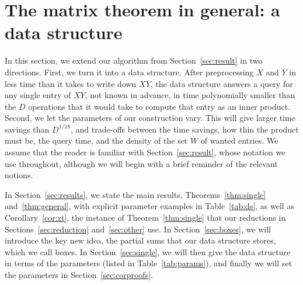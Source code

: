 \section{The matrix theorem in general: a data structure}\label{sec:general}

In this section, we extend our algorithm from Section~\ref{sec:result} in two directions. First, we turn it into a data structure. After preprocessing $X$ and $Y$ in less time than it takes to write down $XY$, the data structure answers a query for any single entry of $XY$, not known in advance, in time polynomially smaller than the $D$ operations that it would take to compute that entry as an inner product. Second, we let the parameters of our construction vary. This will give larger time savings than $D^{1/18}$, and trade-offs between the time savings, how thin the product must be, the query time, and the density of the set $W$ of wanted entries. We assume that the reader is familiar with Section~\ref{sec:result}, whose notation we use throughout, although we will begin with a brief reminder of the relevant notions.

In Section~\ref{sec:results}, we state the main results, Theorems~\ref{thm:single} and~\ref{thm:general}, with explicit parameter examples in Table~\ref{tab:ds}, as well as Corollary~\ref{cor:zt}, the instance of Theorem~\ref{thm:single} that our reductions in Sections~\ref{sec:reduction} and~\ref{sec:other} use. In Section~\ref{sec:boxes}, we will introduce the key new idea, the partial sums that our data structure stores, which we call boxes. In Section~\ref{sec:single}, we will then give the data structure in terms of the parameters (listed in Table~\ref{tab:params}), and finally we will set the parameters in Section~\ref{sec:corproofs}.

